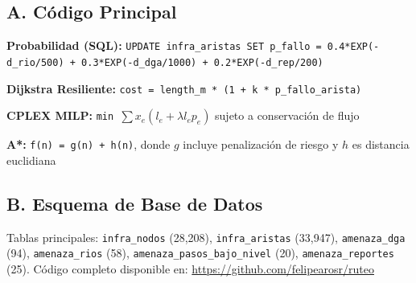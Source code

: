 \documentclass[conference]{IEEEtran}
\begin{document}
\appendix

\subsection*{A. Código Principal}
\label{app:codigo}

\textbf{Probabilidad (SQL):} \texttt{UPDATE infra\_aristas SET p\_fallo = 0.4*EXP(-d\_rio/500) + 0.3*EXP(-d\_dga/1000) + 0.2*EXP(-d\_rep/200)}

\textbf{Dijkstra Resiliente:} \texttt{cost = length\_m * (1 + k * p\_fallo\_arista)}

\textbf{CPLEX MILP:} \texttt{min $\sum x_e (l_e + \lambda l_e p_e)$} sujeto a conservación de flujo

\textbf{A*:} \texttt{f(n) = g(n) + h(n)}, donde $g$ incluye penalización de riesgo y $h$ es distancia euclidiana

\subsection*{B. Esquema de Base de Datos}
\label{app:schema}

Tablas principales: \texttt{infra\_nodos} (28,208), \texttt{infra\_aristas} (33,947), \texttt{amenaza\_dga} (94), \texttt{amenaza\_rios} (58), \texttt{amenaza\_pasos\_bajo\_nivel} (20), \texttt{amenaza\_reportes} (25). Código completo disponible en: \url{https://github.com/felipearosr/ruteo}
\end{document}
